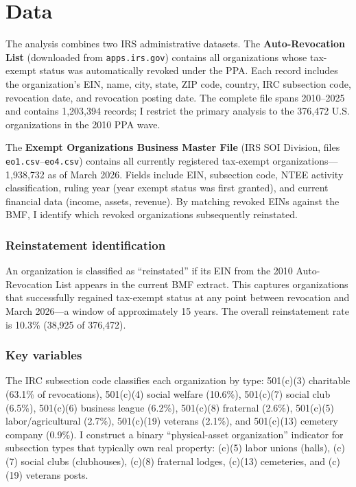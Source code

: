 \documentclass[12pt]{article}
\begin{document}
\section{Data}

The analysis combines two IRS administrative datasets. The \textbf{Auto-Revocation List} (downloaded from \texttt{apps.irs.gov}) contains all organizations whose tax-exempt status was automatically revoked under the PPA. Each record includes the organization's EIN, name, city, state, ZIP code, country, IRC subsection code, revocation date, and revocation posting date. The complete file spans 2010--2025 and contains 1,203,394 records; I restrict the primary analysis to the 376,472 U.S. organizations in the 2010 PPA wave.

The \textbf{Exempt Organizations Business Master File} (IRS SOI Division, files \texttt{eo1.csv}--\texttt{eo4.csv}) contains all currently registered tax-exempt organizations---1,938,732 as of March 2026. Fields include EIN, subsection code, NTEE activity classification, ruling year (year exempt status was first granted), and current financial data (income, assets, revenue). By matching revoked EINs against the BMF, I identify which revoked organizations subsequently reinstated.

\subsubsection*{Reinstatement identification} An organization is classified as ``reinstated'' if its EIN from the 2010 Auto-Revocation List appears in the current BMF extract. This captures organizations that successfully regained tax-exempt status at any point between revocation and March 2026---a window of approximately 15 years. The overall reinstatement rate is 10.3\% (38,925 of 376,472).

\subsubsection*{Key variables} The IRC subsection code classifies each organization by type: 501(c)(3) charitable (63.1\% of revocations), 501(c)(4) social welfare (10.6\%), 501(c)(7) social club (6.5\%), 501(c)(6) business league (6.2\%), 501(c)(8) fraternal (2.6\%), 501(c)(5) labor/agricultural (2.7\%), 501(c)(19) veterans (2.1\%), and 501(c)(13) cemetery company (0.9\%). I construct a binary ``physical-asset organization'' indicator for subsection types that typically own real property: (c)(5) labor unions (halls), (c)(7) social clubs (clubhouses), (c)(8) fraternal lodges, (c)(13) cemeteries, and (c)(19) veterans posts.
\end{document}

